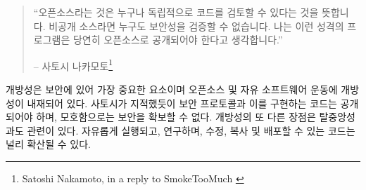 \begin{quotation}\begin{samepage}
	\begin{comment}
		\enquote{Being open source means anyone can independently review the code. If
			it was closed source, nobody could verify the security. I think it's
			essential for a program of this nature to be open source.}
		\begin{flushright} -- Satoshi Nakamoto\footnote{Satoshi Nakamoto, in a reply to SmokeTooMuch \cite{satoshi-open-source}}
		\end{comment}
		\enquote{오픈소스라는 것은 누구나 독립적으로 코드를 검토할 수 있다는 것을 뜻합니다.
			비공개 소스라면 누구도 보안성을 검증할 수 없습니다. 
			나는 이런 성격의 프로그램은 당연히 오픈소스로 공개되어야 한다고 생각합니다.}
		\begin{flushright} -- 사토시 나카모토\footnote{Satoshi Nakamoto, in a reply to SmokeTooMuch \cite{satoshi-open-source}}
\end{flushright}\end{samepage}\end{quotation}
	
\begin{comment}
	Openness is paramount to security and inherent in open source and the
	free software movement. As Satoshi pointed out, secure protocols and the
	code which implements them have to be open --- there is no security
	through obscurity. Another benefit is again related to decentralization:
	code which can be run, studied, modified, copied, and distributed freely
	ensures that it is spread far and wide.
\end{comment}
개방성은 보안에 있어 가장 중요한 요소이며 오픈소스 및 자유 소프트웨어 운동에 개방성이 내재되어 있다.
사토시가 지적했듯이 보안 프로토콜과 이를 구현하는 코드는 공개되어야 하며, 모호함으로는 보안을 확보할 수 없다.
개방성의 또 다른 장점은 탈중앙성과도 관련이 있다.
자유롭게 실행되고, 연구하며, 수정, 복사 및 배포할 수 있는 코드는 널리 확산될 수 있다.
	

